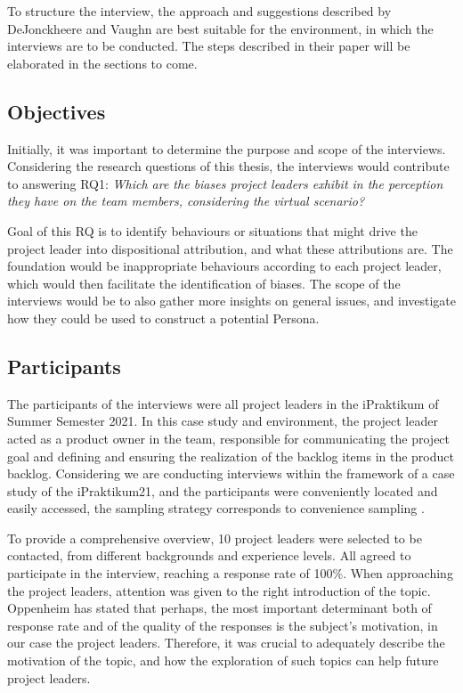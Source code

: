 To structure the interview, the approach and suggestions described by DeJonckheere and Vaughn \cite{Dejonckheere2019} are best suitable for the environment, in which the interviews are to be conducted. The steps described in their paper will be elaborated in the sections to come.

\subsection{Objectives}

Initially, it was important to determine the purpose and scope of the interviews. Considering the research questions of this thesis, the interviews would contribute to answering RQ1: \textit{Which are the biases project leaders exhibit in the perception they have on the team members, considering the virtual scenario?}

Goal of this RQ is to identify behaviours or situations that might drive the project leader into dispositional attribution, and what these attributions are. The foundation would be inappropriate behaviours according to each project leader, which would then facilitate the identification of biases. The scope of the interviews would be to also gather more insights on general issues, and investigate how they could be used to construct a potential Persona.

\subsection{Participants}

The participants of the interviews were all project leaders in the iPraktikum of Summer Semester 2021. In this case study and environment, the project leader acted as a product owner in the team, responsible for communicating the project goal and defining and ensuring the realization of the backlog items in the product backlog. Considering we are conducting interviews within the framework of a case study of the iPraktikum21, and the participants were conveniently located and easily accessed, the sampling strategy corresponds to convenience sampling \cite{Galloway2005}. 

To provide a comprehensive overview, 10 project leaders were selected to be contacted, from different backgrounds and experience levels. All agreed to participate in the interview, reaching a response rate of 100\%. When approaching the project leaders, attention was given to the right introduction of the topic. Oppenheim \cite{Oppenheim1992} has stated that perhaps, the most important determinant both of response rate and of the quality of the responses is the subject's motivation, in our case the project leaders. Therefore, it was crucial to adequately describe the motivation of the topic, and how the exploration of such topics can help future project leaders. 

